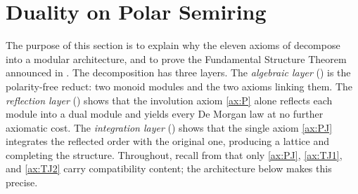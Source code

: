 
\section{Duality on Polar Semiring}\label{sec:arch}

The purpose of this section is to explain why the eleven axioms of
 decompose into a modular architecture, and to prove the
Fundamental Structure Theorem announced in
. The decomposition has three layers. The
\emph{algebraic layer} () is the polarity-free
reduct: two monoid modules and the two axioms linking them. The
\emph{reflection layer} () shows that the involution
axiom \eqref{ax:P} alone reflects each module into a dual module and yields
every De Morgan law at no further axiomatic cost. The \emph{integration
layer} () shows that the single axiom
\eqref{ax:PJ} integrates the reflected order with the original one,
producing a lattice and completing the structure. Throughout, recall from
 that only \eqref{ax:PJ},
\eqref{ax:TJ1}, and \eqref{ax:TJ2} carry compatibility content; the
architecture below makes this precise.






\def\xunit{0.8cm}
\def\yunit{0.5cm}

